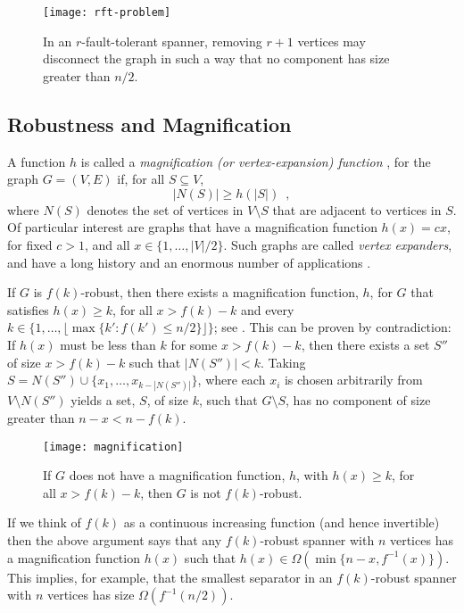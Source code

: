 \documentclass[final]{siamltex}
\begin{document}
\begin{figure}
  \begin{center}
    \texttt{[image: rft-problem]}
  \end{center}
  \caption{In an $r$-fault-tolerant spanner, removing $r+1$ vertices may
  disconnect the graph in such a way that no component has size greater
  than $n/2$.}
\end{figure}

\subsection{Robustness and Magnification}

A function $h$ is called a \emph{magnification (or vertex-expansion)
function} \cite[Page~390]{kalai91}, for the graph $G=(V,E)$ if, for all
$S\subseteq V$,
\[
    |N(S)| \ge h(|S|) \enspace ,
\]
where $N(S)$ denotes the set of vertices in $V\setminus S$ that
are adjacent to vertices in $S$.  Of particular interest are graphs
that have a magnification function $h(x)=cx$, for fixed $c>1$, and
all $x\in\{1,\ldots,|V|/2\}$.  Such graphs are called \emph{vertex
expanders}, and have a long history and an enormous number of applications
\cite{hlw06}.

If $G$ is $f(k)$-robust, then there exists a magnification function,
$h$, for $G$ that satisfies $h(x) \ge k$, for all $x> f(k)-k$
and every $k\in\{1,\ldots,\lfloor\max\{k':f(k')\le n/2\}\rfloor\}$;
see .  This can be proven by contradiction:
If $h(x)$ must be less than $k$ for some $x> f(k)-k$, then there
exists a set $S''$ of size $x>f(k)-k$ such that $|N(S'')|< k$.  Taking
$S=N(S'')\cup\{x_1,\ldots,x_{k-|N(S'')|}\}$, where each $x_i$ is chosen
arbitrarily from $V\setminus N(S'')$ yields a set, $S$, of size $k$, such
that $G\setminus S$, has no component of size greater than $n-x < n-f(k)$.

\begin{figure}
  \begin{center}
    \texttt{[image: magnification]}
  \end{center}
  \caption{If $G$ does not have a magnification function, $h$, with
  $h(x)\ge k$, for all $x> f(k)-k$, then $G$ is not $f(k)$-robust.}
\end{figure}

If we think of $f(k)$ as a continuous increasing function (and
hence invertible) then the above argument says that any $f(k)$-robust
spanner with $n$ vertices has a magnification function $h(x)$ such that
$h(x)\in\Omega(\min\{n-x,f^{-1}(x)\})$.  This implies, for example, that the
smallest separator in an $f(k)$-robust spanner with $n$ vertices has
size $\Omega(f^{-1}(n/2))$.
\end{document}
